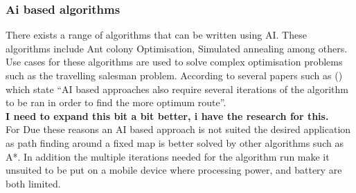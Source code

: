 \subsubsection{Ai based algorithms}
There exists a range of algorithms that can be written using AI. These algorithms include Ant colony Optimisation, Simulated annealing among others. Use cases for these algorithms are used to solve complex optimisation problems such as the travelling salesman problem. According to several papers such as (\citetemp \citetemp) which state “AI based approaches also require several iterations of the algorithm to be ran in order to find the more optimum route”.\\
\large{\bfseries \color{red} I need to expand this bit a bit better, i have the research for this.}\\
 For Due these reasons an AI based approach is not suited the desired application as path finding around a fixed map is better solved by other algorithms such as A*. In addition the multiple iterations needed for the algorithm run make it unsuited to be put on a mobile device where processing power, and battery are both limited.  
